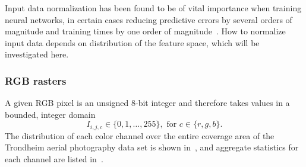 Input data normalization has been found to be of vital importance when training neural networks, in certain cases reducing predictive errors by several orders of magnitude and training times by one order of magnitude~\cite{input_normalization_1997}.
How to normalize input data depends on distribution of the feature space, which will be investigated here.


\subsubsection*{RGB rasters}

A given RGB pixel is an unsigned 8-bit integer and therefore takes values in a bounded, integer domain
%
\begin{equation*}
  I_{i,j,c} \in \{0, 1, \ldots, 255\}, \text{ for } c \in \{r, g, b\}.
\end{equation*}
%
The distribution of each color channel over the entire coverage area of the Trondheim aerial photography data set is shown in~, and aggregate statistics for each channel are listed in~.

\begin{figure}[htb]
  \begin{floatrow}
  \end{floatrow}
\end{figure}

